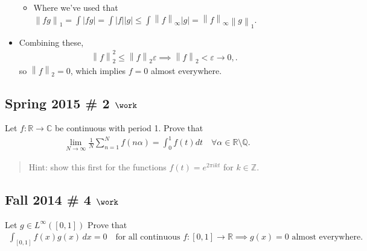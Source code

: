 \begin{solution}
\begin{itemize}
  \begin{itemize}
  \tightlist
  \item
    Where we've used that
    \({\left\lVert {fg} \right\rVert}_1 = \int {\left\lvert {fg} \right\rvert} = \int {\left\lvert {f} \right\rvert}{\left\lvert {g} \right\rvert} \leq \int {\left\lVert {f} \right\rVert}_\infty {\left\lvert {g} \right\rvert} = {\left\lVert {f} \right\rVert}_\infty {\left\lVert {g} \right\rVert}_1\).
  \end{itemize}
\item
  Combining these,
  \begin{align*}
  {\left\lVert {f} \right\rVert}_2^2 \leq {\left\lVert {f} \right\rVert}_2 \varepsilon\implies {\left\lVert {f} \right\rVert}_2 < \varepsilon\to 0,
  .\end{align*}
  so \({\left\lVert {f} \right\rVert}_2 = 0\), which implies \(f=0\)
  almost everywhere.
\end{itemize}

\end{solution}

\hypertarget{spring-2015-2-work}{%
\subsection{\texorpdfstring{Spring 2015 \# 2
\(\work\)}{Spring 2015 \# 2 \textbackslash work}}\label{spring-2015-2-work}}

Let \(f: {\mathbb{R}}\to {\mathbb{C}}\) be continuous with period 1.
Prove that
\begin{align*}
\lim _{N \rightarrow \infty} \frac{1}{N} \sum_{n=1}^{N} f(n \alpha)=\int_{0}^{1} f(t) d t \quad \forall \alpha \in {\mathbb{R}}\setminus{\mathbb{Q}}.
\end{align*}

\begin{quote}
Hint: show this first for the functions \(f(t) = e^{2\pi i k t}\) for
\(k\in {\mathbb{Z}}\).
\end{quote}

\hypertarget{fall-2014-4-work}{%
\subsection{\texorpdfstring{Fall 2014 \# 4
\(\work\)}{Fall 2014 \# 4 \textbackslash work}}\label{fall-2014-4-work}}

Let \(g\in L^\infty([0, 1])\) Prove that
\begin{align*}
\int _{[0,1]} f(x) g(x)\, dx = 0 
\quad\text{for all continuous } f:[0, 1] \to {\mathbb{R}}
\implies g(x) = 0 \text{ almost everywhere. }
\end{align*}

